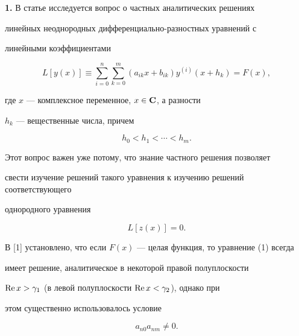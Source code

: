 

\maketitle


\label{begin}








{\bf 1.} В статье исследуется вопрос о частных аналитических решениях


линейных неоднородных дифференциально-разностных уравнений с


линейными коэффициентами


\begin{equation}


L[y(x)]\equiv\sum_{i=0}^n \sum_{k=0}^m(a_{ik}x+b_{ik})y^{(i)}(x+h_{k})=F(x),


\end{equation}


где $x$ --- комплексное переменное, $x\in {\bold C}$, а разности


$h_{k}$ --- вещественные числа, причем


\begin{equation}


h_{0}<h_{1}<\dotsb<h_{m}.


\end{equation}


Этот вопрос важен уже потому, что знание частного решения позволяет


свести изучение решений такого уравнения к изучению решений соответствующего


однородного уравнения


\begin{equation}


L[z(x)]=0.


\end{equation}





В [1] установлено, что если $F(x)$ --- целая функция, то уравнение (1) всегда


имеет решение, аналитическое в некоторой правой полуплоскости


$\operatorname{Re} x>\gamma_{1}$ (в левой полуплоскости $\operatorname{Re} x<\gamma_{2}$), однако при


этом существенно использовалось условие


\begin{equation}


a_{n0}a_{nm}\ne 0.


\end{equation}


